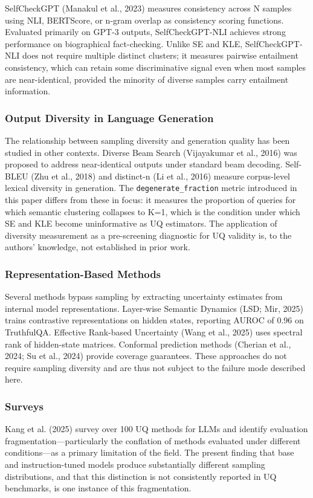 SelfCheckGPT (Manakul et al., 2023) measures consistency across N samples using NLI, BERTScore, or n-gram overlap as consistency scoring functions. Evaluated primarily on GPT-3 outputs, SelfCheckGPT-NLI achieves strong performance on biographical fact-checking. Unlike SE and KLE, SelfCheckGPT-NLI does not require multiple distinct clusters; it measures pairwise entailment consistency, which can retain some discriminative signal even when most samples are near-identical, provided the minority of diverse samples carry entailment information.

\subsubsection{Output Diversity in Language Generation}

The relationship between sampling diversity and generation quality has been studied in other contexts. Diverse Beam Search (Vijayakumar et al., 2016) was proposed to address near-identical outputs under standard beam decoding. Self-BLEU (Zhu et al., 2018) and distinct-n (Li et al., 2016) measure corpus-level lexical diversity in generation. The \texttt{degenerate_fraction} metric introduced in this paper differs from these in focus: it measures the proportion of queries for which semantic clustering collapses to K=1, which is the condition under which SE and KLE become uninformative as UQ estimators. The application of diversity measurement as a pre-screening diagnostic for UQ validity is, to the authors' knowledge, not established in prior work.

\subsubsection{Representation-Based Methods}

Several methods bypass sampling by extracting uncertainty estimates from internal model representations. Layer-wise Semantic Dynamics (LSD; Mir, 2025) trains contrastive representations on hidden states, reporting AUROC of 0.96 on TruthfulQA. Effective Rank-based Uncertainty (Wang et al., 2025) uses spectral rank of hidden-state matrices. Conformal prediction methods (Cherian et al., 2024; Su et al., 2024) provide coverage guarantees. These approaches do not require sampling diversity and are thus not subject to the failure mode described here.

\subsubsection{Surveys}

Kang et al. (2025) survey over 100 UQ methods for LLMs and identify evaluation fragmentation—particularly the conflation of methods evaluated under different conditions—as a primary limitation of the field. The present finding that base and instruction-tuned models produce substantially different sampling distributions, and that this distinction is not consistently reported in UQ benchmarks, is one instance of this fragmentation.

